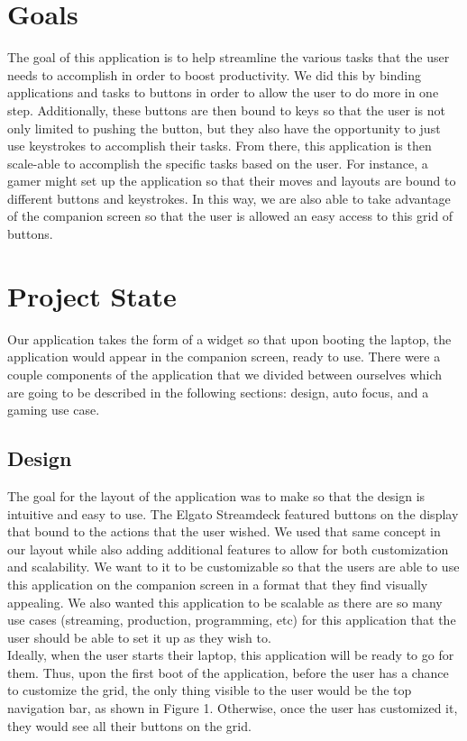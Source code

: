 \documentclass[fullpage, 10pt, onecolumn, draftclsnofoot]{IEEEtran}
\begin{document}
\section{Goals}
The goal of this application is to help streamline the various tasks that the user needs to accomplish in order to boost productivity. We did this by binding applications and tasks to buttons in order to allow the user to do more in one step. Additionally, these buttons are then bound to keys so that the user is not only limited to pushing the button, but they also have the opportunity to just use keystrokes to accomplish their tasks. From there, this application is then scale-able to accomplish the specific tasks based on the user. For instance, a gamer might set up the application so that their moves and layouts are bound to different buttons and keystrokes. In this way, we are also able to take advantage of the companion screen so that the user is allowed an easy access to this grid of buttons.
\section{Project State}
Our application takes the form of a widget so that upon booting the laptop, the application would appear in the companion screen, ready to use. There were a couple components of the application that we divided between ourselves which are going to be described in the following sections: design, auto focus, and a gaming use case.
\subsection{Design}
The goal for the layout of the application was to make so that the design is intuitive and easy to use. The Elgato Streamdeck featured buttons on the display that bound to the actions that the user wished. We used that same concept in our layout while also adding additional features to allow for both customization and scalability. We want to it to be customizable so that the users are able to use this application on the companion screen in a format that they find visually appealing. We also wanted this application to be scalable as there are so many use cases (streaming, production, programming, etc) for this application that the user should be able to set it up as they wish to. \\
\newline
\indent Ideally, when the user starts their laptop, this application will be ready to go for them. Thus, upon the first boot of the application, before the user has a chance to customize the grid, the only thing visible to the user would be the top navigation bar, as shown in Figure 1. Otherwise, once the user has customized it, they would see all their buttons on the grid.
\end{document}
